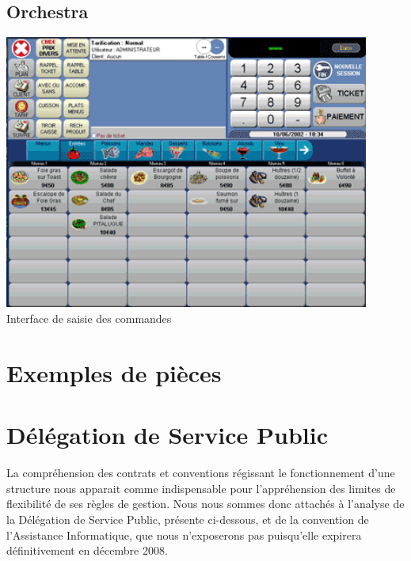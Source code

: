\subsection{Orchestra}
\label{bar_orchestra}
\begin{center}
	\includegraphics[width=12cm]{annexes/images/bar_orchestra.png} \\
	Interface de saisie des commandes
\end{center}

\pagestyle{plain}
\section{Exemples de pièces}


\section{Délégation de Service Public}

La compréhension des contrats et conventions régissant le fonctionnement d'une
structure nous apparait comme indispensable pour l'appréhension des limites de
flexibilité de ses règles de gestion. Nous nous sommes donc attachés à l'analyse
de la Délégation de Service Public, présente ci-dessous, et de la convention
de l'Assistance Informatique, que nous n'exposerons pas puisqu'elle expirera 
définitivement en décembre 2008.

\newpage

\begin{center}
	
\end{center}

\newpage

